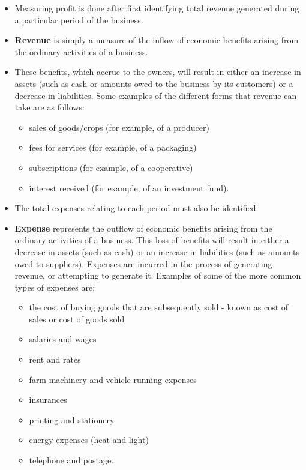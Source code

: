 \documentclass[12pt,ignorenonframetext,aspectratio=169]{beamer}
\providecommand{\tightlist}{%
  \setlength{\itemsep}{0pt}\setlength{\parskip}{0pt}}
\begin{document}
\begin{frame}{}
\protect\hypertarget{section-3}{}
\begin{itemize}
\tightlist
\item
  Measuring profit is done after first identifying total revenue
  generated during a particular period of the business.
\item
  \textbf{Revenue} is simply a measure of the inflow of economic
  benefits arising from the ordinary activities of a business.
\item
  These benefits, which accrue to the owners, will result in either an
  increase in assets (such as cash or amounts owed to the business by
  its customers) or a decrease in liabilities. Some examples of the
  different forms that revenue can take are as follows:

  \begin{itemize}
  \tightlist
  \item
    sales of goods/crops (for example, of a producer)
  \item
    fees for services (for example, of a packaging)
  \item
    subscriptions (for example, of a cooperative)
  \item
    interest received (for example, of an investment fund).
  \end{itemize}
\end{itemize}
\end{frame}

\begin{frame}{}
\protect\hypertarget{section-4}{}
\footnotesize

\begin{itemize}
\tightlist
\item
  The total expenses relating to each period must also be identified.
\item
  \textbf{Expense} represents the outflow of economic benefits arising
  from the ordinary activities of a business. This loss of benefits will
  result in either a decrease in assets (such as cash) or an increase in
  liabilities (such as amounts owed to suppliers). Expenses are incurred
  in the process of generating revenue, or attempting to generate it.
  Examples of some of the more common types of expenses are:

  \begin{itemize}
  \tightlist
  \item
    the cost of buying goods that are subsequently sold - known as cost
    of sales or cost of goods sold
  \item
    salaries and wages
  \item
    rent and rates
  \item
    farm machinery and vehicle running expenses
  \item
    insurances
  \item
    printing and stationery
  \item
    energy expenses (heat and light)
  \item
    telephone and postage.
  \end{itemize}
\end{itemize}
\end{frame}
\end{document}
